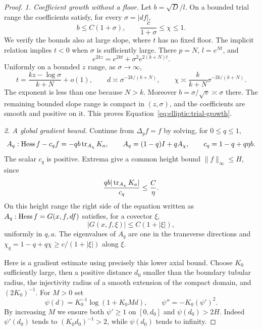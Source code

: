 \begin{proof}
\medskip\noindent\emph{1. Coefficient growth without a floor.}
Let $b=\sqrt D/l$.  On a bounded trial range the coefficients satisfy,
for every $\sigma=|df|$,
\begin{equation}\label{eq:elliptic:trial-growth}
 b\le C(1+\sigma),\qquad
 \frac{c}{1+\sigma}\le\chi\le1.
\end{equation}
We verify the bounds also at large slope, where $t$ has no fixed floor.
The implicit relation implies $t<0$ when $\sigma$ is sufficiently large.
There $p=N$, $l=e^{Nt}$, and
\[
 e^{2kz}=e^{2kt}+\sigma^2e^{2(k+N)t}.
\]
Uniformly on a bounded $z$ range, as $\sigma\to\infty$,
\[
 t=\frac{kz-\log\sigma}{k+N}+o(1),\qquad
 d\asymp\sigma^{-2k/(k+N)},\qquad
 \chi\asymp\frac{k}{k+N}\sigma^{-2k/(k+N)}.
\]
The exponent is less than one because $N>k$.
Moreover $b=\sigma/\sqrt v\asymp\sigma$ there.
The remaining bounded slope range is compact in $(z,\sigma)$, and
the coefficients are smooth and positive on it.  This proves
Equation~\eqref{eq:elliptic:trial-growth}.

\medskip\noindent\emph{2. A global gradient bound.}
Continue from $\Delta_g f=f$ by solving, for $0\le q\le1$,
\begin{equation}\label{eq:elliptic:trace-continuation}
 A_q:\operatorname{Hess} f-c_q f=-q b\operatorname{tr}_{A_\chi}K_a,
 \qquad A_q=(1-q)I+qA_\chi,
 \qquad c_q=1-q+q\eta b.
\end{equation}
The scalar $c_q$ is positive.  Extrema give a common height bound
$\|f\|_\infty\le H$, since
\[
 \frac{q b|\operatorname{tr}_{A_\chi}K_a|}{c_q}\le\frac C\eta.
\]
On this height range the right side of the equation written as
$A_q:\operatorname{Hess} f=G(x,f,df)$ satisfies, for a covector $\xi$,
\begin{equation}\label{eq:elliptic:trial-forcing}
 |G(x,f,\xi)|\le C(1+|\xi|),
\end{equation}
uniformly in $q,a$.  The eigenvalues of $A_q$ are one in the
transverse directions and $\chi_q=1-q+q\chi\ge c/(1+|\xi|)$ along $\xi$.

Here is a gradient estimate using precisely this lower axial bound.
Choose $K_0$ sufficiently large, then a positive distance $d_0$ smaller
than the boundary tubular radius, the injectivity radius of a smooth
extension of the compact domain, and $(2K_0)^{-1}$.
For $M>0$ set
\begin{equation}\label{eq:elliptic:log-modulus}
 \psi(d)=K_0^{-1}\log(1+K_0Md),\qquad
 \psi''=-K_0(\psi')^2.
\end{equation}
By increasing $M$ we ensure both $\psi'\ge1$ on $[0,d_0]$ and
$\psi(d_0)>2H$.  Indeed $\psi'(d_0)$ tends to
$(K_0d_0)^{-1}>2$, while $\psi(d_0)$ tends to infinity.


\end{proof}
